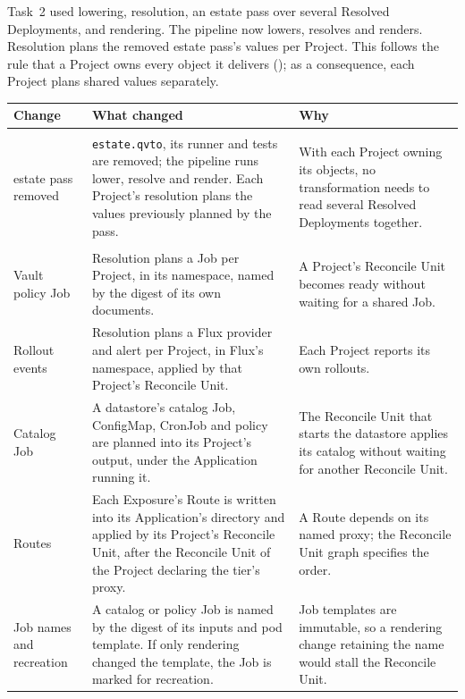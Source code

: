 Task~2 used lowering, resolution, an estate pass over several Resolved Deployments,
and rendering. The pipeline now lowers, resolves and renders. Resolution plans
the removed estate pass's values per Project. This follows the rule that a Project
owns every object it delivers (); as a
consequence, each Project plans shared values separately.


\begin{table}[!htbp]
\centering
\footnotesize
\begin{tabular}{>{\raggedright\arraybackslash}p{}>{\raggedright\arraybackslash}p{}>{\raggedright\arraybackslash}p{}}
\hline
\textbf{Change} & \textbf{What changed} & \textbf{Why} \\
\hline
\multicolumn{3}{l}{\textit{Pipeline}} \\
estate pass removed & \texttt{estate.qvto}, its runner and tests are removed; the pipeline runs lower, resolve and render. Each Project's resolution plans the values previously planned by the pass. & With each Project owning its objects, no transformation needs to read several Resolved Deployments together. \\
\multicolumn{3}{l}{\textit{Values planned and applied in the Project's own Reconcile Unit}} \\
Vault policy Job & Resolution plans a Job per Project, in its namespace, named by the digest of its own documents. & A Project's Reconcile Unit becomes ready without waiting for a shared Job. \\
Rollout events & Resolution plans a Flux provider and alert per Project, in Flux's namespace, applied by that Project's Reconcile Unit. & Each Project reports its own rollouts. \\
Catalog Job & A datastore's catalog Job, ConfigMap, CronJob and policy are planned into its Project's output, under the Application running it. & The Reconcile Unit that starts the datastore applies its catalog without waiting for another Reconcile Unit. \\
Routes & Each Exposure's Route is written into its Application's directory and applied by its Project's Reconcile Unit, after the Reconcile Unit of the Project declaring the tier's proxy. & A Route depends on its named proxy; the Reconcile Unit graph specifies the order. \\
Job names and recreation & A catalog or policy Job is named by the digest of its inputs and pod template. If only rendering changed the template, the Job is marked for recreation. & Job templates are immutable, so a rendering change retaining the name would stall the Reconcile Unit. \\

\end{tabular}
\end{table}
